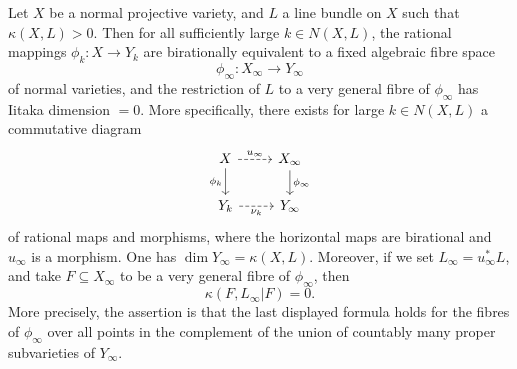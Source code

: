     \begin{theorem}\label{thm:Iitaka_fibration}
        Let \( X \) be a normal projective variety, and \( L \) a line bundle on \( X \) such that \( \kappa(X,L) > 0 \). Then for all sufficiently large \( k \in N(X,L) \), the rational mappings \( \phi_k : X \rightarrow Y_k \) are birationally equivalent to a fixed algebraic fibre space
        \[
        \phi_{\infty} : X_{\infty} \rightarrow Y_{\infty}
        \]
        of normal varieties, and the restriction of \( L \) to a very general fibre of \( \phi_{\infty} \) has Iitaka dimension \( = 0 \). More specifically, there exists for large \( k \in N(X,L) \) a commutative diagram
        \[
        \begin{tikzcd}
        X \arrow[d, "\phi_k"'] \arrow[r, dashed, "u_{\infty}"] & X_{\infty} \arrow[d, "\phi_{\infty}"] \\
        Y_k \arrow[r, dashed, "\nu_k"'] & Y_{\infty}
        \end{tikzcd}
        \]
        of rational maps and morphisms, where the horizontal maps are birational and \( u_{\infty} \) is a morphism. One has \(\dim Y_{\infty} = \kappa(X,L)\). Moreover, if we set \( L_{\infty} = u^{*}_{\infty}L \), and take \( F \subseteq X_{\infty} \) to be a very general fibre of \( \phi_{\infty} \), then
        \[
        \kappa(F, L_{\infty} | F) = 0.
        \]
        More precisely, the assertion is that the last displayed formula holds for the fibres of \( \phi_{\infty} \) over all points in the complement of the union of countably many proper subvarieties of \( Y_{\infty} \).
    \end{theorem}


